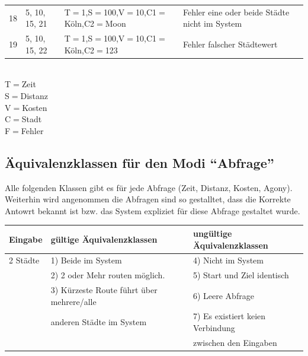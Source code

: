 \documentclass[a4paper]{report}
\begin{document}
\begin{landscape}
\begin{tabular}{|l|l|l|l|}
18 		& 5, 10, 15, 21		& T$=$1,S$=$100,V$=$10,C1$=$Köln,C2$=$Moon & Fehler eine oder beide Städte nicht im System\\
19 		& 5, 10, 15, 22		& T$=$1,S$=$100,V$=$10,C1$=$Köln,C2$=$123 & Fehler falscher Städtewert\\ 
\hline
\end{tabular}\\
T$=$Zeit\\
S$=$Distanz\\
V$=$Kosten\\
C$=$Stadt\\
F$=$Fehler\\
\end{landscape}

\subsection*{Äquivalenzklassen für den Modi ``Abfrage''}
Alle folgenden Klassen gibt es für jede Abfrage (Zeit, Distanz, Kosten, Agony). Weiterhin wird angenommen die Abfragen sind so gestalltet, dass die Korrekte Antowrt bekannt ist bzw. das System expliziet für diese Abfrage gestaltet wurde.
\begin{tabular}{|l|l|l|}
\hline
    Eingabe 	& gültige Äquivalenzklassen 	& ungültige Äquivalenzklassen\\
    \hline
2 Städte 	& 1) Beide im System						& 4) Nicht im System \\
		& 2) 2 oder Mehr routen möglich.				& 5) Start und Ziel identisch \\
		& 3) Kürzeste Route führt über mehrere/alle 			& 6) Leere Abfrage \\
		&    anderen Städte im System 					& 7) Es existiert keien Verbindung \\
		&								& zwischen den Eingaben \\
\hline    
\end{tabular}
\end{document}

